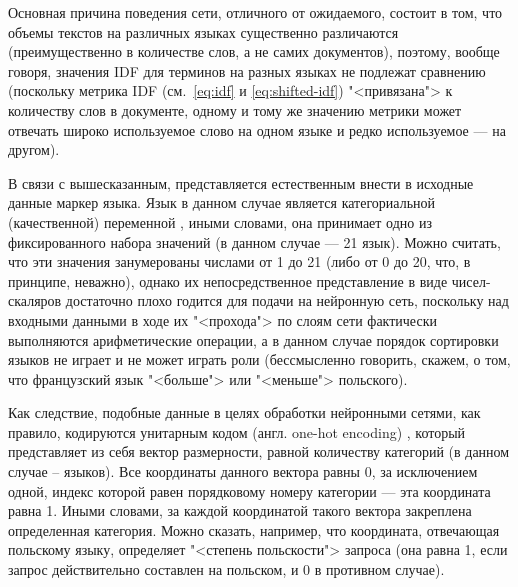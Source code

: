 Основная причина поведения сети, отличного от ожидаемого, состоит в том, что объемы текстов на различных языках существенно различаются
(преимущественно в количестве слов, а не самих документов), поэтому, вообще говоря, значения IDF для терминов на разных языках не подлежат
сравнению (поскольку метрика IDF (см.~\eqref{eq:idf} и \eqref{eq:shifted-idf}) "<привязана"> к количеству слов в документе, одному и тому же
значению метрики может отвечать широко используемое слово на одном языке и редко используемое --- на другом).

В связи с вышесказанным, представляется естественным внести в исходные данные маркер языка. Язык в данном случае является категориальной
(качественной) переменной \cite{1319113338}, иными словами, она принимает одно из фиксированного набора значений (в данном случае --- 21 язык).
Можно считать, что эти значения занумерованы числами от 1 до 21 (либо от 0 до 20, что, в принципе, неважно), однако их непосредственное
представление в виде чисел-скаляров достаточно плохо годится для подачи на нейронную сеть, поскольку над входными данными в ходе их 
"<прохода"> по слоям сети фактически выполняются арифметические операции, а в данном случае порядок сортировки языков не играет и не может 
играть роли (бессмысленно говорить, скажем, о том, что французский язык "<больше"> или "<меньше"> польского).

Как следствие, подобные данные в целях обработки нейронными сетями, как правило, кодируются унитарным кодом (англ. one-hot encoding) 
\cite{harris2013digital}, который представляет из себя вектор размерности, равной количеству категорий (в данном случае -- языков). Все координаты
данного вектора равны 0, за исключением одной, индекс которой равен порядковому номеру категории --- эта координата равна 1. Иными словами,
за каждой координатой такого вектора закреплена определенная категория. Можно сказать, например, что координата, отвечающая польскому языку,
определяет "<степень польскости"> запроса (она равна 1, если запрос действительно составлен на польском, и 0 в противном случае).

